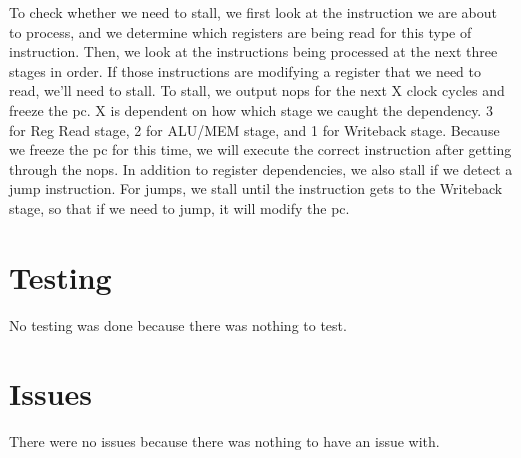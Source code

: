 \documentclass[sigconf]{acmart}
\begin{document}
To check whether we need to stall, we first look at the instruction we are about to process, and we determine which registers are being read for this type of instruction. Then, we look at the instructions being processed at the next three stages in order. If those instructions are modifying a register that we need to read, we'll need to stall. To stall, we output nops for the next X clock cycles and freeze the pc. X is dependent on how which stage we caught the dependency. 3 for Reg Read stage, 2 for ALU/MEM stage, and 1 for Writeback stage. Because we freeze the pc for this time, we will execute the correct instruction after getting through the nops. In addition to register dependencies, we also stall if we detect a jump instruction. For jumps, we stall until the instruction gets to the Writeback stage, so that if we need to jump, it will modify the pc. 


\section{Testing}
No testing was done because there was nothing to test.

\section{Issues}
There were no issues because there was nothing to have an issue with.
\end{document}
